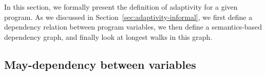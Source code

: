  In this section, we formally present the definition of adaptivity for a given program. As we discussed in Section~\ref{sec:adaptivity-informal}, we first define a dependency relation between program variables, we then define a semantics-based dependency graph, and finally look at longest walks in this graph. 

\subsection{May-dependency between variables}
\label{sec:dep}
%
